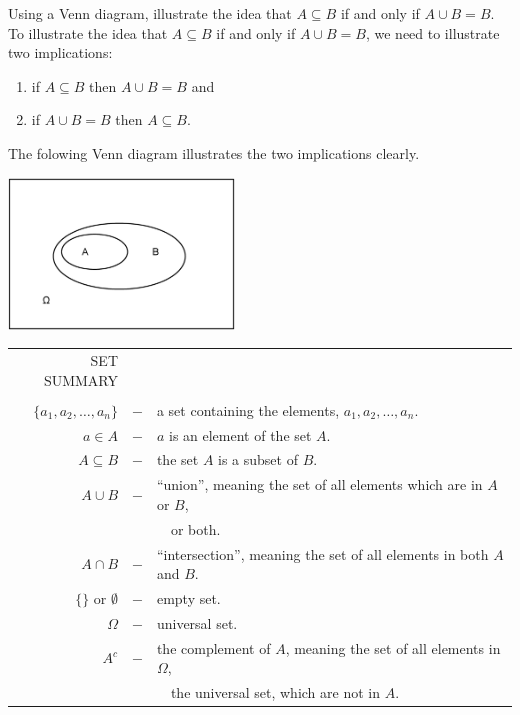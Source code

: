 \begin{ExerciseList}

\Exercise
Using a Venn diagram, illustrate the idea that  $A\subseteq B$ if and only if $A\cup B=B$.
\Answer
To illustrate the idea that $A\subseteq B$ if and only if $A\cup B=B$, we need to illustrate two implications:
\begin{enumerate}
\item if $A\subseteq B$ then  $A\cup B=B$ and
\item if  $A\cup B=B$ then $A\subseteq B$.
\end{enumerate}
The folowing Venn diagram illustrates the two implications clearly.
\begin{center}
\includegraphics[width=6cm]{figures/AB}
\end{center}

\end{ExerciseList}

\begin{framed}
\begin{tabular}{rcl}
SET SUMMARY\\ \\
$\{a_1,a_2,\dots,a_n\}$& $-$& a set containing the elements, $a_1,a_2,\dots,a_n$.\\
$a\in A$ &$-$& $a$ is an element of the set $A$.\\
$A\subseteq B$ &$-$& the set $A$ is a subset of $B$.\\
$A\cup B$ &$-$& ``union'', meaning the set of all elements which are in $A$ or $B$, \\
& & \ \ or both.\\
$A\cap B$ &$-$& ``intersection'', meaning the set of all elements in both $A$ and $B$.\\
$\{\}$ or $\emptyset$ &$-$& empty set.\\
$\Omega $ &$-$& universal set.  \\
$A^c $ &$-$& the complement of $A$, meaning the set of all elements in $\Omega$,\\
& & \ \ the universal set, which are not in $A$.\\
\end{tabular}
\end{framed}


